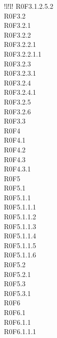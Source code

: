 \begin{tabella}{!{\VRule}l!{\VRule}l!{\VRule}}
{					R0F3.1.2.5.2 \\
					R0F3.2 \\
					R0F3.2.1 \\
					R0F3.2.2 \\
					R0F3.2.2.1 \\
					R0F3.2.2.1.1 \\
					R0F3.2.3 \\
					R0F3.2.3.1 \\
					R0F3.2.4 \\
					R0F3.2.4.1 \\
					R0F3.2.5 \\
					R0F3.2.6 \\
					R0F3.3 \\
					R0F4 \\
					R0F4.1 \\
					R0F4.2 \\
					R0F4.3 \\
					R0F4.3.1 \\
					R0F5 \\
					R0F5.1 \\
					R0F5.1.1 \\
					R0F5.1.1.1 \\
					R0F5.1.1.2 \\
					R0F5.1.1.3 \\
					R0F5.1.1.4 \\
					R0F5.1.1.5 \\
					R0F5.1.1.6 \\
					R0F5.2 \\
					R0F5.2.1 \\
					R0F5.3 \\
					R0F5.3.1 \\
					R0F6 \\
					R0F6.1 \\
					R0F6.1.1 \\
					R0F6.1.1.1 \\
				} \\ 
					

\end{tabella}
